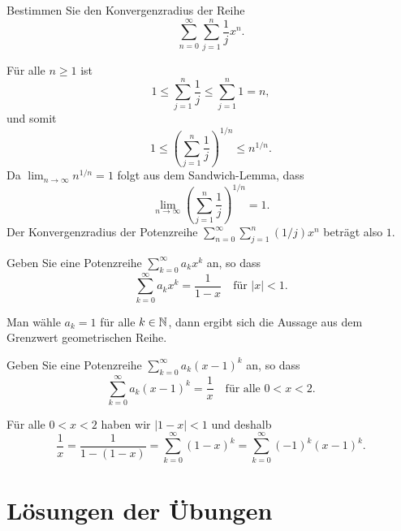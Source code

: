 \documentclass[a4paper,10pt]{article}
\begin{document}
\begin{question}
 Bestimmen Sie den Konvergenzradius der Reihe
 \[
  \sum_{n=0}^\infty \sum_{j=1}^n \frac{1}{j} x^n.
 \]
\end{question}
\begin{solution}
 Für alle $n \geq 1$ ist
 \[
  1 \leq \sum_{j=1}^n \frac{1}{j} \leq \sum_{j=1}^n 1 = n,
 \]
 und somit
 \[
  1 \leq \left( \sum_{j=1}^n \frac{1}{j} \right)^{1/n} \leq n^{1/n}.
 \]
 Da $\lim_{n \to \infty} n^{1/n} = 1$ folgt aus dem Sandwich-Lemma, dass
 \[
  \lim_{n \to \infty} \left( \sum_{j=1}^n \frac{1}{j} \right)^{1/n} = 1.
 \]
 Der Konvergenzradius der Potenzreihe $\sum_{n=0}^\infty \sum_{j=1}^n (1/j) x^n$ beträgt also $1$.
\end{solution}


\begin{question}
Geben Sie eine Potenzreihe $\sum_{k=0}^\infty a_k x^k$ an, so dass
\[
 \sum_{k=0}^\infty a_k x^k = \frac{1}{1-x} \quad \text{für $|x| < 1$}.
\]
\end{question}
\begin{solution}
 Man wähle $a_k = 1$ für alle $k \in \mathbb{N}$, dann ergibt sich die Aussage aus dem Grenzwert geometrischen Reihe.
\end{solution}


\begin{question}
 Geben Sie eine Potenzreihe $\sum_{k=0}^\infty a_k (x-1)^k$ an, so dass
 \[
  \sum_{k=0}^\infty a_k (x-1)^k = \frac{1}{x} \quad \text{für alle $0 < x < 2$}.
 \]
\end{question}
\begin{solution}
 Für alle $0 < x < 2$ haben wir $|1-x| < 1$ und deshalb
 \[
  \frac{1}{x}
  = \frac{1}{1-(1-x)}
  = \sum_{k=0}^\infty (1-x)^k
  = \sum_{k=0}^\infty (-1)^k (x-1)^k.
 \]
\end{solution}















\newpage





\section{Lösungen der Übungen}

\printsolutions
\end{document}
